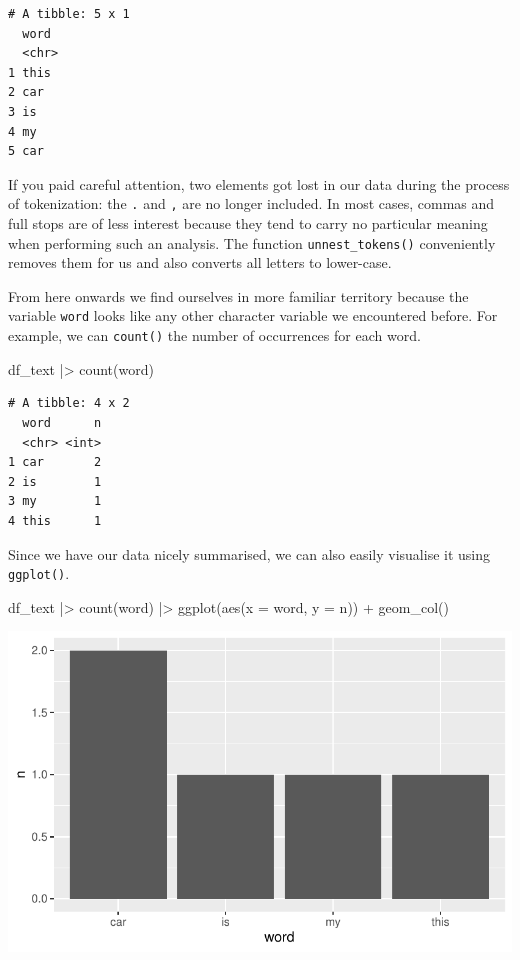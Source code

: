 \documentclass[
  letterpaper,
]{krantz}
\makeatletter
\newenvironment{Shaded}{\begin{snugshade}}{\end{snugshade}}
\newcommand{\AttributeTok}[1]{\textcolor[rgb]{0.40,0.45,0.13}{#1}}
\newcommand{\FunctionTok}[1]{\textcolor[rgb]{0.28,0.35,0.67}{#1}}
\newcommand{\NormalTok}[1]{\textcolor[rgb]{0.00,0.23,0.31}{#1}}
\newcommand{\SpecialCharTok}[1]{\textcolor[rgb]{0.37,0.37,0.37}{#1}}
\newenvironment{kframe}{%
\medskip{}
\setlength{\fboxsep}{.8em}
 \def\at@end@of@kframe{}%
 \ifinner\ifhmode%
  \def\at@end@of@kframe{\end{minipage}}%
  \begin{minipage}{\columnwidth}%
 \fi\fi%
 \def\FrameCommand##1{\hskip\@totalleftmargin \hskip-\fboxsep
 \colorbox{shadecolor}{##1}\hskip-\fboxsep
     \hskip-\linewidth \hskip-\@totalleftmargin \hskip\columnwidth}%
 \MakeFramed {\advance\hsize-\width
   \@totalleftmargin\z@ \linewidth\hsize
   \@setminipage}}%
 {\par\unskip\endMakeFramed%
 \at@end@of@kframe}
\renewenvironment{Shaded}{\begin{kframe}}{\end{kframe}}
\makeatother
\begin{document}
\begin{verbatim}
# A tibble: 5 x 1
  word 
  <chr>
1 this 
2 car  
3 is   
4 my   
5 car  
\end{verbatim}

If you paid careful attention, two elements got lost in our data during
the process of tokenization: the \texttt{.} and \texttt{,} are no longer
included. In most cases, commas and full stops are of less interest
because they tend to carry no particular meaning when performing such an
analysis. The function \texttt{unnest\_tokens()} conveniently removes
them for us and also converts all letters to lower-case.

From here onwards we find ourselves in more familiar territory because
the variable \texttt{word} looks like any other character variable we
encountered before. For example, we can \texttt{count()} the number of
occurrences for each word.

\begin{Shaded}
\begin{Highlighting}[]
\NormalTok{df\_text }\SpecialCharTok{|\textgreater{}} \FunctionTok{count}\NormalTok{(word)}
\end{Highlighting}
\end{Shaded}

\begin{verbatim}
# A tibble: 4 x 2
  word      n
  <chr> <int>
1 car       2
2 is        1
3 my        1
4 this      1
\end{verbatim}

Since we have our data nicely summarised, we can also easily visualise
it using \texttt{ggplot()}.

\begin{Shaded}
\begin{Highlighting}[]
\NormalTok{df\_text }\SpecialCharTok{|\textgreater{}}
  \FunctionTok{count}\NormalTok{(word) }\SpecialCharTok{|\textgreater{}}
  \FunctionTok{ggplot}\NormalTok{(}\FunctionTok{aes}\NormalTok{(}\AttributeTok{x =}\NormalTok{ word,}
             \AttributeTok{y =}\NormalTok{ n)) }\SpecialCharTok{+}
  \FunctionTok{geom\_col}\NormalTok{()}
\end{Highlighting}
\end{Shaded}

\includegraphics{14_mixed_methods_files/figure-pdf/visualise-word-freq-1.pdf}
\end{document}
